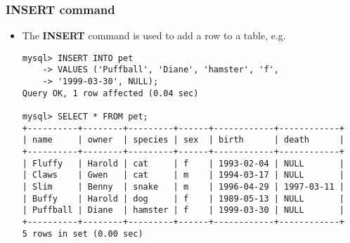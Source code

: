 \documentclass[hyperref={pdfpagelabels=false},svgnames,xcolor=table]{beamer}
\begin{document}
\begin{frame}[fragile]
  \frametitle{INSERT command}
  \begin{itemize}
    \item The \textbf{INSERT} command is used to add a row to a table, e.g.\ 
\begin{scriptsize}
\begin{verbatim}
mysql> INSERT INTO pet
    -> VALUES ('Puffball', 'Diane', 'hamster', 'f', 
    -> '1999-03-30', NULL);
Query OK, 1 row affected (0.04 sec)

mysql> SELECT * FROM pet;
+----------+--------+---------+------+------------+------------+
| name     | owner  | species | sex  | birth      | death      |
+----------+--------+---------+------+------------+------------+
| Fluffy   | Harold | cat     | f    | 1993-02-04 | NULL       |
| Claws    | Gwen   | cat     | m    | 1994-03-17 | NULL       |
| Slim     | Benny  | snake   | m    | 1996-04-29 | 1997-03-11 |
| Buffy    | Harold | dog     | f    | 1989-05-13 | NULL       |
| Puffball | Diane  | hamster | f    | 1999-03-30 | NULL       |
+----------+--------+---------+------+------------+------------+
5 rows in set (0.00 sec)
\end{verbatim}
\end{scriptsize}
  \end{itemize}
\end{frame}
\end{document}
